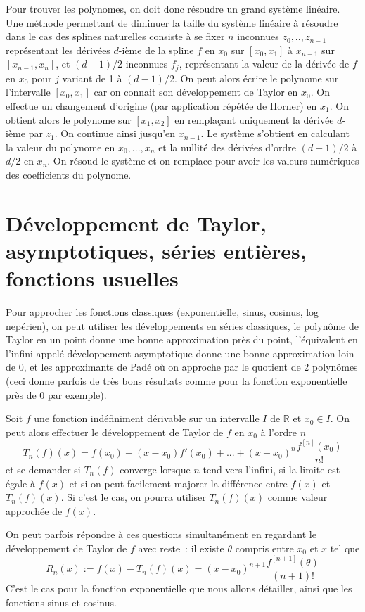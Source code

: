 \documentclass[a4paper,11pt]{article}
\newcommand{\R}{{\mathbb{R}}}
\begin{document}
Pour trouver les polynomes, on doit donc résoudre un grand système
linéaire. Une méthode permettant de diminuer la taille du système
linéaire à résoudre dans le cas des splines naturelles
consiste à se fixer $n$ inconnues $z_0,..,z_{n-1}$
représentant les dérivées $d$-ième de la spline $f$ en
$x_0$ sur $[x_0,x_1]$ à $x_{n-1}$ sur $[x_{n-1},x_n]$, 
et $(d-1)/2$ inconnues $f_j$, représentant
la valeur de la dérivée de $f$ en $x_0$ pour $j$ variant
de 1 à $(d-1)/2$. On peut alors écrire le polynome sur l'intervalle
$[x_0,x_1]$ car on connait son développement de Taylor en $x_0$.
On effectue un changement d'origine (par application répétée
de Horner) en $x_1$. On obtient alors le polynome sur $[x_1,x_2]$
en remplaçant uniquement la dérivée $d$-ième par $z_1$.
On continue ainsi jusqu'en $x_{n-1}$. Le système s'obtient en
calculant la valeur du polynome en $x_0,...,x_n$ et la nullité
des dérivées d'ordre $(d-1)/2$ à $d/2$ en $x_n$. On résoud
le système et on remplace pour avoir les valeurs numériques
des coefficients du polynome.


\section{Développement de Taylor, asymptotiques, 
s\'eries enti\`eres, fonctions usuelles}
\label{sec:series}
Pour approcher les fonctions classiques (exponentielle, sinus,
cosinus, log nepérien), on peut utiliser les développements en séries 
classiques, le polyn\^ome de Taylor en un point donne
une bonne approximation pr\`es du point, l'équivalent
en l'infini appelé développement asymptotique donne
une bonne approximation loin de 0, et
les approximants de Pad\'e 
o\`u on approche par le quotient de 2 polyn\^omes (ceci
donne parfois de tr\`es bons r\'esultats comme pour la fonction
exponentielle pr\`es de 0 par exemple).


Soit $f$ une fonction indéfiniment dérivable sur un intervalle $I$ de $\R$
et $x_0 \in I$. On peut alors effectuer le développement de Taylor de $f$
en $x_0$ à l'ordre $n$
\[ T_n(f)(x)= f(x_0) + (x-x_0) f'(x_0) + ... + 
(x-x_0)^n \frac{f^{[n]}(x_0)}{n!} \]
et se demander si $T_n(f)$ converge lorsque $n$ tend vers
l'infini, si la limite est égale à $f(x)$ et si on peut facilement
majorer la différence entre $f(x)$ et $T_n(f)(x)$. Si c'est le
cas, on pourra utiliser $T_n(f)(x)$ comme valeur approchée de $f(x)$.

On peut parfois répondre à ces questions simultanément en regardant le
développement de Taylor de $f$ avec reste~: il existe $\theta$ compris
entre $x_0$ et $x$ tel que
\[ R_n(x) := f(x)- T_n(f)(x) = (x-x_0)^{n+1}\frac{f^{[n+1]}(\theta)}{(n+1)!} \]
C'est le cas pour la fonction exponentielle que nous allons
détailler, ainsi que les fonctions sinus et cosinus.
\end{document}
